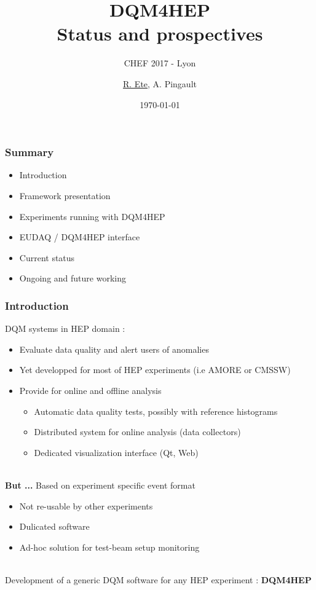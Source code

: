 \documentclass[presentation, 10pt]{beamer}
\title{DQM4HEP \\ Status and prospectives}
\subtitle{CHEF 2017 - Lyon}
\author[R. Ete]{\underline{R. Ete}, A. Pingault}
\institute{DESY}
\date{\today}
\begin{document}
\maketitle

\begin{frame}
  \frametitle{Summary}

  \begin{itemize}
    \item Introduction
    \item Framework presentation
    \item Experiments running with DQM4HEP
    \item EUDAQ / DQM4HEP interface
    \item Current status
    \item Ongoing and future working
  \end{itemize}
  
\end{frame}

\begin{frame}
  \frametitle{Introduction}
  \footnotesize
  DQM systems in HEP domain :
  \begin{itemize}
    \item Evaluate data quality and alert users of anomalies
    \item Yet developped for most of HEP experiments (i.e AMORE or CMSSW)
    \item Provide for online and offline analysis
    \begin{itemize}
      \item Automatic data quality tests, possibly with reference histograms
      \item Distributed system for online analysis (data collectors)
      \item Dedicated visualization interface (Qt, Web)
    \end{itemize}
  \end{itemize}
  ~\\
  \textbf{But ...} Based on experiment specific event format
  \begin{itemize}
    \item Not re-usable by other experiments
    \item Dulicated software
    \item Ad-hoc solution for test-beam setup monitoring
  \end{itemize}
  ~\\
  Development of a generic DQM software for any HEP experiment : \textbf{DQM4HEP}
\end{frame}
\end{document}
